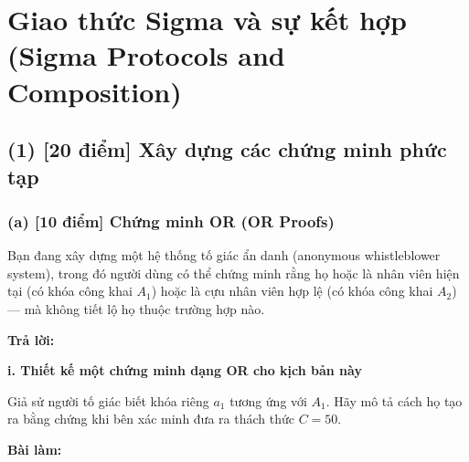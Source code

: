 \section{Giao thức Sigma và sự kết hợp (Sigma Protocols and Composition)}

\subsection{(1) [20 điểm] Xây dựng các chứng minh phức tạp}

\subsubsection{(a) [10 điểm] Chứng minh OR (OR Proofs)}

Bạn đang xây dựng một hệ thống tố giác ẩn danh (anonymous whistleblower system), trong đó người dùng có thể chứng minh rằng họ hoặc là nhân viên hiện tại (có khóa công khai $A_1$) hoặc là cựu nhân viên hợp lệ (có khóa công khai $A_2$) — mà không tiết lộ họ thuộc trường hợp nào.

\begin{center}
    \textbf{Trả lời:}
\end{center}

\textbf{i. Thiết kế một chứng minh dạng OR cho kịch bản này}

Giả sử người tố giác biết khóa riêng $a_1$ tương ứng với $A_1$.
Hãy mô tả cách họ tạo ra bằng chứng khi bên xác minh đưa ra thách thức $C = 50$.

\textbf{Bài làm:}

